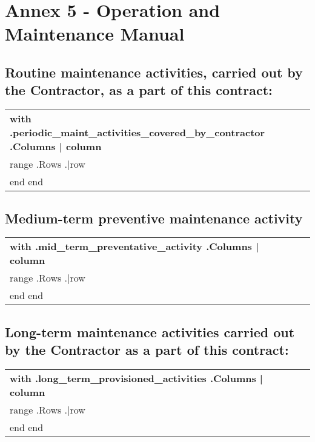 \section{Annex 5 {-} Operation and Maintenance Manual}

\subsection{Routine maintenance activities, carried out by the Contractor, as a part of this contract:}


\begin{center}
\begin{tabu}{|X[3]|X|X|X|X|} \tabucline{} \rowfont[c]\bfseries
{{with .periodic_maint_activities_covered_by_contractor}} %
	{{.Columns | column}} \\\tabucline{}
	{{range .Rows}} %
	{{.|row}} \\\tabucline{}
	{{end}}
{{end}}
\end{tabu}
\end{center}

\subsection{Medium-term preventive maintenance activity}


\begin{center}
\begin{tabu}{|X[3]|X|X|X|X|} \tabucline{} \rowfont[c]\bfseries
{{with .mid_term_preventative_activity}} %
	{{.Columns | column}} \\\tabucline{}
	{{range .Rows}} %
	{{.|row}} \\\tabucline{}
	{{end}}
{{end}}
\end{tabu}
\end{center}

\subsection{Long-term maintenance activities carried out by the Contractor as a part of this contract:}


\begin{center}
\begin{tabu}{|X[3]|X|X|X|X|} \tabucline{} \rowfont[c]\bfseries
{{with .long_term_provisioned_activities}} %
	{{.Columns | column}} \\\tabucline{}
	{{range .Rows}} %
	{{.|row}} \\\tabucline{}
	{{end}}
{{end}}
\end{tabu}
\end{center}

